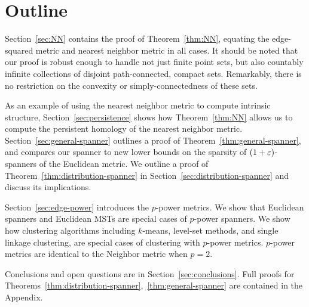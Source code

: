 \section{Outline}
%
Section~\ref{sec:NN} contains the proof of Theorem~\ref{thm:NN},
equating the edge-squared metric and nearest neighbor metric in
all cases. It should be noted that our proof is robust enough to handle not
just finite point sets, but also countably infinite collections of disjoint
path-connected, compact sets. Remarkably, there is no restriction on the convexity or
simply-connectedness of these sets.

As an example of using the nearest neighbor metric to compute intrinsic structure, Section~\ref{sec:persistence} shows how Theorem~\ref{thm:NN} allows us to compute the persistent homology of the nearest neighbor metric.
Section~\ref{sec:general-spanner} outlines a proof of Theorem~\ref{thm:general-spanner}, and compares our spanner to new lower
bounds
on the sparsity of $(1+\varepsilon)$-spanners of the Euclidean metric.
We outline a proof of Theorem~\ref{thm:distribution-spanner} in
Section~\ref{sec:distribution-spanner} and discuss its implications.

Section~\ref{sec:edge-power} introduces the $p$-power metrics. We show
that Euclidean spanners and Euclidean MSTs are special cases of
$p$-power spanners. We show how
clustering algorithms including $k$-means, level-set methods,
and single linkage clustering, are special cases of
clustering with $p$-power metrics. $p$-power metrics are identical to the
Neighbor metric when $p=2$.


Conclusions and open questions are in
Section~\ref{sec:conclusions}. Full proofs for
Theorems~\ref{thm:distribution-spanner},~\ref{thm:general-spanner}
are contained in the Appendix.
